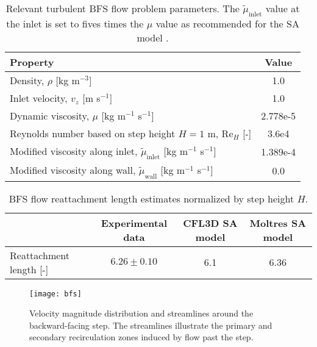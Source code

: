 \begin{table}[htb]
  \centering
  \small
  \caption{Relevant turbulent \gls{BFS} flow problem parameters. The $\tilde{\mu}_\text{inlet}$ value
  at the inlet is set to fives times the $\mu$ value as recommended for the \gls{SA} model
  \cite{spalart_one-equation_1994}.}
  \begin{tabular}{l S}
    \toprule
    Property & {Value} \\
    \midrule
    Density, $\rho$ [kg m$^{-3}$] & 1.0 \\
    Inlet velocity, $v_z$ [m s$^{-1}$] & 1.0 \\
    Dynamic viscosity, $\mu$ [kg m$^{-1}$ s$^{-1}$] & 2.778e-5 \\
    Reynolds number based on step height $H=1$ m, Re$_H$ [-] & 3.6e4 \\
    Modified viscosity along inlet, $\tilde{\mu}_\text{inlet}$ [kg m$^{-1}$ s$^{-1}$] & 1.389e-4 \\
    Modified viscosity along wall, $\tilde{\mu}_\text{wall}$ [kg m$^{-1}$ s$^{-1}$] & 0.0 \\
    \bottomrule
  \end{tabular}
  \label{table:bfs}
\end{table}

\begin{table}[htb]
  \centering
  \small
  \caption{\gls{BFS} flow reattachment length estimates normalized by step height $H$.}
  \begin{tabular}{l c c c}
    \toprule
    & {Experimental data \cite{driver_features_1985}} & {CFL3D \gls{SA} model
  \cite{rumsey_turbulence_nodate}} & {Moltres \gls{SA} model} \\
    \midrule
    Reattachment length [-] & {$6.26 \pm 0.10$} & 6.1 & 6.36 \\
    \bottomrule
  \end{tabular}
  \label{table:bfs-reattach}
\end{table}

\begin{figure}[htb!]
  \centering
  \texttt{[image: bfs]}
  \caption{Velocity magnitude distribution and streamlines around the backward-facing step. The
  streamlines illustrate the primary and secondary recirculation zones induced by flow past the
  step.}
  \label{fig:bfs}
\end{figure}

